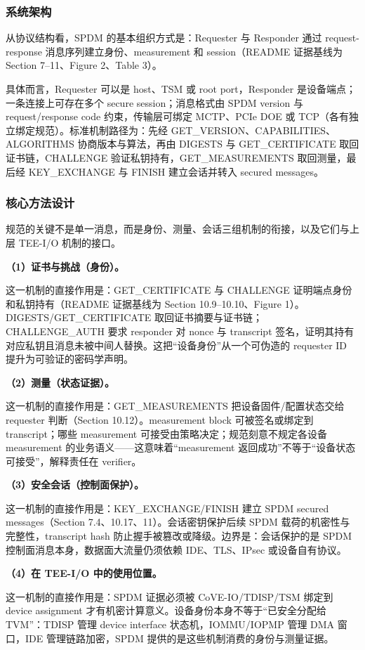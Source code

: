 \documentclass[11pt]{ctexart}
\begin{document}
\subsubsection{系统架构}
从协议结构看，SPDM 的基本组织方式是：Requester 与 Responder 通过 request-response 消息序列建立身份、measurement 和 session（README 证据基线为 Section 7--11、Figure 2、Table 3）。\par
具体而言，Requester 可以是 host、TSM 或 root port，Responder 是设备端点；一条连接上可存在多个 secure session；消息格式由 SPDM version 与 request/response code 约束，传输层可绑定 MCTP、PCIe DOE 或 TCP（各有独立绑定规范）。标准机制路径为：先经 GET\_VERSION、CAPABILITIES、ALGORITHMS 协商版本与算法，再由 DIGESTS 与 GET\_CERTIFICATE 取回证书链，CHALLENGE 验证私钥持有，GET\_MEASUREMENTS 取回测量，最后经 KEY\_EXCHANGE 与 FINISH 建立会话并转入 secured messages。\par
\subsubsection{核心方法设计}
规范的关键不是单一消息，而是身份、测量、会话三组机制的衔接，以及它们与上层 TEE-I/O 机制的接口。\par
\noindent\textbf{（1）证书与挑战（身份）。}\par
这一机制的直接作用是：GET\_CERTIFICATE 与 CHALLENGE 证明端点身份和私钥持有（README 证据基线为 Section 10.9--10.10、Figure 1）。DIGESTS/GET\_CERTIFICATE 取回证书摘要与证书链；CHALLENGE\_AUTH 要求 responder 对 nonce 与 transcript 签名，证明其持有对应私钥且消息未被中间人替换。这把“设备身份”从一个可伪造的 requester ID 提升为可验证的密码学声明。\par
\noindent\textbf{（2）测量（状态证据）。}\par
这一机制的直接作用是：GET\_MEASUREMENTS 把设备固件/配置状态交给 requester 判断（Section 10.12）。measurement block 可被签名或绑定到 transcript；哪些 measurement 可接受由策略决定；规范刻意不规定各设备 measurement 的业务语义——这意味着“measurement 返回成功”不等于“设备状态可接受”，解释责任在 verifier。\par
\noindent\textbf{（3）安全会话（控制面保护）。}\par
这一机制的直接作用是：KEY\_EXCHANGE/FINISH 建立 SPDM secured messages（Section 7.4、10.17、11）。会话密钥保护后续 SPDM 载荷的机密性与完整性，transcript hash 防止握手被篡改或降级。边界是：会话保护的是 SPDM 控制面消息本身，数据面大流量仍须依赖 IDE、TLS、IPsec 或设备自有协议。\par
\noindent\textbf{（4）在 TEE-I/O 中的使用位置。}\par
这一机制的直接作用是：SPDM 证据必须被 CoVE-IO/TDISP/TSM 绑定到 device assignment 才有机密计算意义。设备身份本身不等于“已安全分配给 TVM”：TDISP 管理 device interface 状态机，IOMMU/IOPMP 管理 DMA 窗口，IDE 管理链路加密，SPDM 提供的是这些机制消费的身份与测量证据。\par
\end{document}
